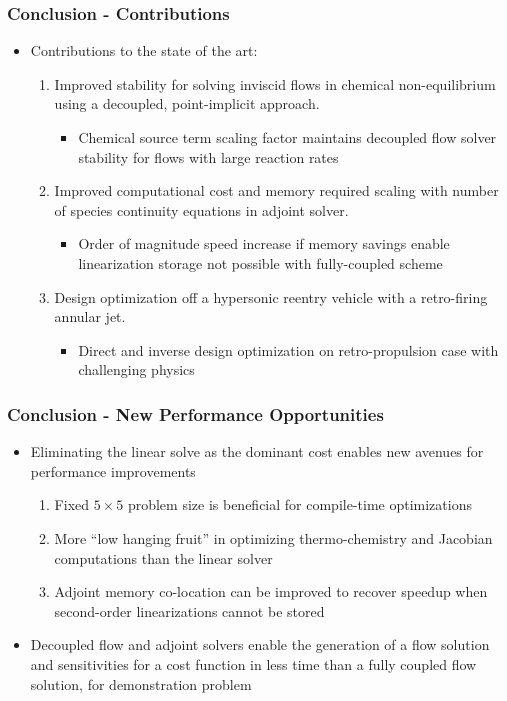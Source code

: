 \documentclass{beamer}
\begin{document}
\begin{frame}
  \frametitle{Conclusion - Contributions}
  \begin{itemize}
    \item Contributions to the state of the art:
      \begin{enumerate}
        \item<1-> Improved stability for solving inviscid flows in chemical
          non-equilibrium using a decoupled, point-implicit approach.
          \begin{itemize}
            \item Chemical source term scaling factor maintains decoupled flow
              solver stability for flows with large reaction rates
          \end{itemize}
        \item<2-> Improved computational cost and memory required scaling with
          number of species continuity equations in adjoint solver.
          \begin{itemize}
            \item Order of magnitude speed increase if memory savings enable
              linearization storage not possible with fully-coupled scheme
          \end{itemize}
        \item<3-> Design optimization off a hypersonic reentry vehicle with a
          retro-firing annular jet.
          \begin{itemize}
            \item Direct and inverse design optimization on retro-propulsion
              case with challenging physics
          \end{itemize}
      \end{enumerate}
  \end{itemize}
\end{frame}

\begin{frame}
  \frametitle{Conclusion - New Performance Opportunities}
  \begin{itemize}
    \item Eliminating the linear solve as the dominant cost enables new avenues
      for performance improvements
      \begin{enumerate}
        \item Fixed $5 \times 5$ problem size is beneficial for compile-time
          optimizations
        \item More ``low hanging fruit'' in optimizing thermo-chemistry and
          Jacobian computations than the linear solver
        \item Adjoint memory co-location can be improved to recover speedup when
          second-order linearizations cannot be stored
      \end{enumerate}
    \item Decoupled flow and adjoint solvers enable the generation of a flow
      solution and sensitivities for a cost function in less time than a fully
      coupled flow solution, for demonstration problem
  \end{itemize}
\end{frame}
\end{document}
